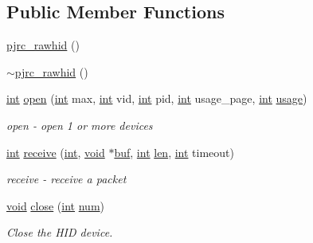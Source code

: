 \subsection*{Public Member Functions}
\begin{DoxyCompactItemize}
\item 
\hyperlink{group___raw_h_i_d_plugin_gac45cb09ef64b6ae7d47e4d8a3a8ffdbe}{pjrc\-\_\-rawhid} ()
\item 
\hyperlink{group___raw_h_i_d_plugin_ga2ddf20ce0f573f8fdaae4134abe0c33f}{$\sim$pjrc\-\_\-rawhid} ()
\item 
\hyperlink{ioapi_8h_a787fa3cf048117ba7123753c1e74fcd6}{int} \hyperlink{group___raw_h_i_d_plugin_ga5ec309dd6bff41a84e52450d10db5fa7}{open} (\hyperlink{ioapi_8h_a787fa3cf048117ba7123753c1e74fcd6}{int} max, \hyperlink{ioapi_8h_a787fa3cf048117ba7123753c1e74fcd6}{int} vid, \hyperlink{ioapi_8h_a787fa3cf048117ba7123753c1e74fcd6}{int} pid, \hyperlink{ioapi_8h_a787fa3cf048117ba7123753c1e74fcd6}{int} usage\-\_\-page, \hyperlink{ioapi_8h_a787fa3cf048117ba7123753c1e74fcd6}{int} \hyperlink{glext_8h_ae759ed0394ed5353d8bef2fb755305da}{usage})
\begin{DoxyCompactList}\small\item\em open -\/ open 1 or more devices \end{DoxyCompactList}\item 
\hyperlink{ioapi_8h_a787fa3cf048117ba7123753c1e74fcd6}{int} \hyperlink{group___raw_h_i_d_plugin_gad2cd7d0625e39c7743d3bd814c5829d1}{receive} (\hyperlink{ioapi_8h_a787fa3cf048117ba7123753c1e74fcd6}{int}, \hyperlink{group___u_a_v_objects_plugin_ga444cf2ff3f0ecbe028adce838d373f5c}{void} $\ast$\hyperlink{ioapi_8h_a8ad8a13c88886b9f623034ff88570adb}{buf}, \hyperlink{ioapi_8h_a787fa3cf048117ba7123753c1e74fcd6}{int} \hyperlink{glext_8h_ac759c9f8b2506530e65879e566e59f02}{len}, \hyperlink{ioapi_8h_a787fa3cf048117ba7123753c1e74fcd6}{int} timeout)
\begin{DoxyCompactList}\small\item\em receive -\/ receive a packet \end{DoxyCompactList}\item 
\hyperlink{group___u_a_v_objects_plugin_ga444cf2ff3f0ecbe028adce838d373f5c}{void} \hyperlink{group___raw_h_i_d_plugin_gaa8ef1b93b6d941b6213a87ccdcd45d91}{close} (\hyperlink{ioapi_8h_a787fa3cf048117ba7123753c1e74fcd6}{int} \hyperlink{glext_8h_abb50fc1ead3a02a46fb52daa2045f95c}{num})
\begin{DoxyCompactList}\small\item\em Close the H\-I\-D device. \end{DoxyCompactList}\item 

\end{DoxyCompactItemize}
